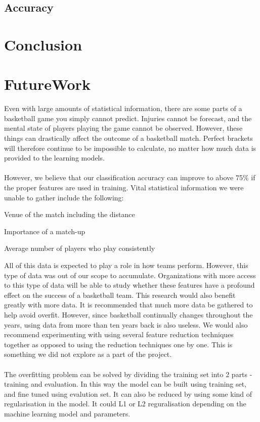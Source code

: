 \documentclass{article}
\begin{document}
\begin{multicols}{2}
	\subsection{Accuracy}
	
	\section{Conclusion}
	\section{FutureWork}	 
Even with large amounts of statistical information, there are some parts of a basketball game you simply cannot predict. Injuries cannot be forecast, and the mental state of players playing the game cannot be observed. However, these things can drastically affect the outcome of a basketball match. Perfect brackets will therefore continue to be impossible to calculate, no matter how much data is provided to the learning models.

\paragraph{}However, we believe that our classification accuracy can improve to above 75\% if the proper features are used in training. Vital statistical information we were unable to gather include the following:
\begin{list}{•}
\item
Venue of the match including the distance
\item
Importance of a match-up
\item
Average number of players who play consistently
\end{list}

All of this data is expected to play a role in how teams perform. However, this type of data was out of our scope to accumulate. Organizations with more access to this type of data will be able to study whether these features have a profound effect on the success of a basketball team. This research would also benefit greatly with more data. It is recommended that much more data be gathered to help avoid overfit. However, since basketball continually changes throughout the years, using data from more than ten years back is also useless. We would also recommend experimenting with using several feature reduction techniques together as opposed to using the reduction techniques one by one. This is something we did not explore as a part of the project.

\paragraph{} The overfitting problem can be solved by dividing the training set into 2 parts - training and evaluation. In this way the model can be built using training set, and fine tuned using evalution set. It can also be reduced by using some kind of regularisation in the model. It could L1 or L2 reguralisation depending on the machine learning model and parameters.
	\end{multicols} 
\end{document}

